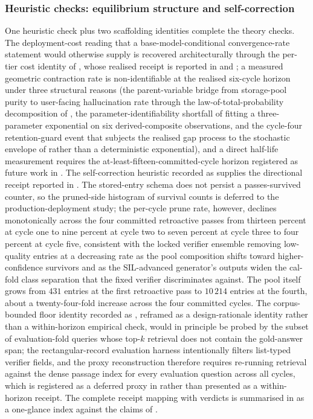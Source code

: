 \subsubsection{Heuristic checks: equilibrium structure and self-correction}
\label{sec:check-corollaries}

One heuristic check plus two scaffolding identities complete the theory checks. The deployment-cost reading that a base-model-conditional convergence-rate statement would otherwise supply is recovered architecturally through the per-tier cost identity of , whose realised receipt is reported in  and ; a measured geometric contraction rate is non-identifiable at the realised six-cycle horizon under three structural reasons (the parent-variable bridge from storage-pool purity to user-facing hallucination rate through the law-of-total-probability decomposition of , the parameter-identifiability shortfall of fitting a three-parameter exponential on six derived-composite observations, and the cycle-four retention-guard event that subjects the realised gap process to the stochastic envelope of  rather than a deterministic exponential), and a direct half-life measurement requires the at-least-fifteen-committed-cycle horizon registered as future work in . The self-correction heuristic recorded as  supplies the directional receipt reported in . The stored-entry schema does not persist a passes-survived counter, so the pruned-side histogram of survival counts is deferred to the production-deployment study; the per-cycle prune rate, however, declines monotonically across the four committed retroactive passes from thirteen percent at cycle one to nine percent at cycle two to seven percent at cycle three to four percent at cycle five, consistent with the locked verifier ensemble removing low-quality entries at a decreasing rate as the pool composition shifts toward higher-confidence survivors and as the SIL-advanced generator's outputs widen the cal-fold class separation that the fixed verifier discriminates against. The pool itself grows from $431$ entries at the first retroactive pass to $10\,214$ entries at the fourth, about a twenty-four-fold increase across the four committed cycles. The corpus-bounded floor identity recorded as , reframed as a design-rationale identity rather than a within-horizon empirical check, would in principle be probed by the subset of evaluation-fold queries whose top-$k$ retrieval does not contain the gold-answer span; the rectangular-record evaluation harness intentionally filters list-typed verifier fields, and the proxy reconstruction therefore requires re-running retrieval against the dense passage index for every evaluation question across all cycles, which is registered as a deferred proxy in  rather than presented as a within-horizon receipt. The complete receipt mapping with verdicts is summarised in  as a one-glance index against the claims of .

